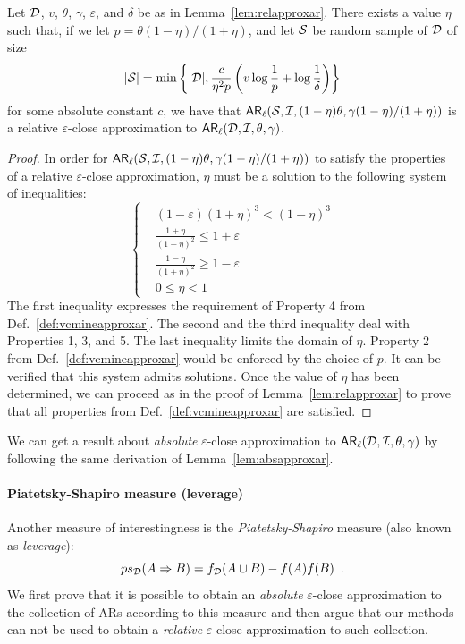 \begin{lemma}\label{lem:liftrelapproxar}
  Let ${\cal D}$, $v$, $\theta$, $\gamma$, $\varepsilon$, and $\delta$ be as in
  Lemma~\ref{lem:relapproxar}. There exists a value $\eta$ such that, if we let
  $p=\theta(1-\eta)/(1+\eta)$, and let ${\cal S}$ be random sample of ${\cal D}$ of size
  \[
  |{\cal S}|=\min\left\{|{\cal D}|,\frac{c}{\eta^2p}\left(v\log\frac{1}{p}+\log\frac{1}{\delta}\right)\right\}
  \]
  for some absolute constant $c$, we have that
  $\mathsf{AR}_{\ell}({\cal S},{\cal I},(1-\eta)\theta,\gamma(1-\eta)/(1+\eta))$ is a relative
  $\varepsilon$-close approximation to $\mathsf{AR}_{\ell}({\cal D},{\cal I},\theta,\gamma)$.
\end{lemma}
\begin{proof}
 In order for
  $\mathsf{AR}_{\ell}({\cal S},{\cal I},(1-\eta)\theta,\gamma(1-\eta)/(1+\eta))$ to satisfy the
  properties of a relative $\varepsilon$-close approximation, $\eta$
  must be a solution to the following system of inequalities:
 \begin{equation*}
   \left\{
   \begin{aligned}
    &(1-\varepsilon)(1+\eta)^3<(1-\eta)^3\\
    &\frac{1+\eta}{(1-\eta)^2}\le 1+\varepsilon\\
    &\frac{1-\eta}{(1+\eta)^2}\ge 1-\varepsilon\\
    &0\le \eta<1
  \end{aligned}
  \right.
  \end{equation*}
    The first inequality expresses the requirement of Property 4 from
  Def.~\ref{def:vcmineapproxar}. The second and the third inequality deal with
  Properties 1, 3, and 5. The last inequality limits the domain of $\eta$.
  Property 2 from Def.~\ref{def:vcmineapproxar} would be enforced by the choice of
  $p$. It can be verified that this system admits solutions.
Once the value of $\eta$ has been determined, we can proceed as in the
  proof of Lemma~\ref{lem:relapproxar} to prove that all properties from
  Def.~\ref{def:vcmineapproxar} are satisfied.
\end{proof}

We can get a result about \emph{absolute} $\varepsilon$-close approximation to
$\mathsf{AR}_\ell({\cal D},{\cal I},\theta,\gamma)$ by following the same derivation of
Lemma~\ref{lem:absapproxar}.

\paragraph{Piatetsky-Shapiro measure (leverage)}
Another measure of interestingness is the
\emph{Piatetsky-Shapiro} measure (also known as \emph{leverage}):
\[
  ps_{\cal D}(A\Rightarrow B) = f_{\cal D}(A\cup B)-f(A)f(B)\enspace.
\]
We first prove that it is possible to obtain an \emph{absolute}
$\varepsilon$-close approximation to the collection of ARs according to this
measure and then argue that our methods can not be used to obtain a
\emph{relative} $\varepsilon$-close approximation to such collection.

